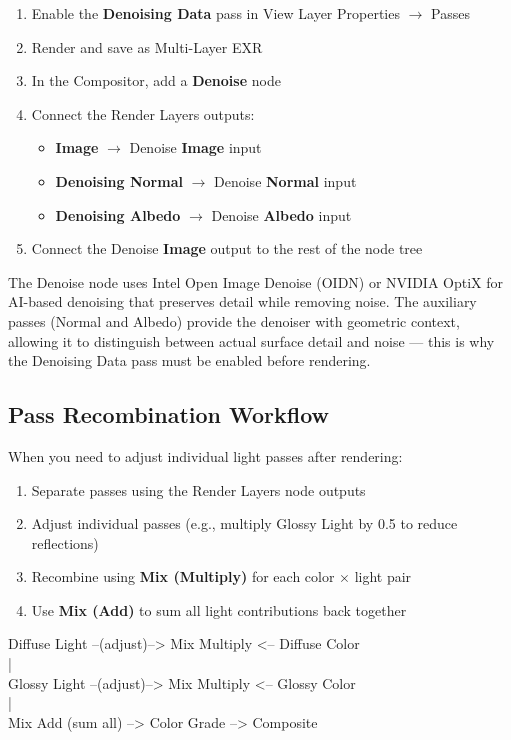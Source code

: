 \begin{enumerate}[leftmargin=2em]
  \item Enable the \textbf{Denoising Data} pass in View Layer Properties $\rightarrow$ Passes
  \item Render and save as Multi-Layer EXR
  \item In the Compositor, add a \textbf{Denoise} node
  \item Connect the Render Layers outputs:
  \begin{itemize}[leftmargin=2em]
    \item \textbf{Image} $\rightarrow$ Denoise \textbf{Image} input
    \item \textbf{Denoising Normal} $\rightarrow$ Denoise \textbf{Normal} input
    \item \textbf{Denoising Albedo} $\rightarrow$ Denoise \textbf{Albedo} input
  \end{itemize}
  \item Connect the Denoise \textbf{Image} output to the rest of the node tree
\end{enumerate}

The Denoise node uses Intel Open Image Denoise (OIDN) or NVIDIA OptiX for AI-based denoising that preserves detail while removing noise. The auxiliary passes (Normal and Albedo) provide the denoiser with geometric context, allowing it to distinguish between actual surface detail and noise --- this is why the Denoising Data pass must be enabled before rendering.

\subsection{Pass Recombination Workflow}

When you need to adjust individual light passes after rendering:

\begin{enumerate}[leftmargin=2em]
  \item Separate passes using the Render Layers node outputs
  \item Adjust individual passes (e.g., multiply Glossy Light by 0.5 to reduce reflections)
  \item Recombine using \textbf{Mix (Multiply)} for each color $\times$ light pair
  \item Use \textbf{Mix (Add)} to sum all light contributions back together
\end{enumerate}

\begin{codebox}
Diffuse Light --(adjust)--> Mix Multiply <-- Diffuse Color\\
\hspace*{12em}|\\
Glossy Light --(adjust)-->  Mix Multiply <-- Glossy Color\\
\hspace*{12em}|\\
\hspace*{7em}Mix Add (sum all) --> Color Grade --> Composite
\end{codebox}

